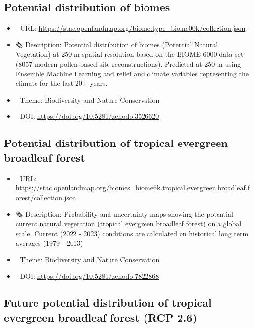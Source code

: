 \documentclass[
  graybox,natbib,nospthms]{svmono}
\providecommand{\tightlist}{%
  \setlength{\itemsep}{0pt}\setlength{\parskip}{0pt}}
\providecommand{\tightlist}{\setlength{\itemsep}{0pt}\setlength{\parskip}{0pt}}
\begin{document}
\hypertarget{potential-distribution-of-biomes}{%
\subsection{Potential distribution of biomes}\label{potential-distribution-of-biomes}}

\begin{itemize}
\tightlist
\item
  🔗 URL: \url{https://stac.openlandmap.org/biome.type_biome00k/collection.json}
\item
  🗞 Description: Potential distribution of biomes (Potential Natural Vegetation) at 250 m spatial resolution based on the BIOME 6000 data set (8057 modern pollen-based site reconstructions). Predicted at 250 m using Ensemble Machine Learning and relief and climate variables representing the climate for the last 20+ years.
\item
  📝 Theme: Biodiversity and Nature Conservation
\item
  📂 DOI: \url{https://doi.org/10.5281/zenodo.3526620}
\end{itemize}

\hypertarget{potential-distribution-of-tropical-evergreen-broadleaf-forest}{%
\subsection{Potential distribution of tropical evergreen broadleaf forest}\label{potential-distribution-of-tropical-evergreen-broadleaf-forest}}

\begin{itemize}
\tightlist
\item
  🔗 URL: \url{https://stac.openlandmap.org/biomes_biome6k.tropical.evergreen.broadleaf.forest/collection.json}
\item
  🗞 Description: Probability and uncertainty maps showing the potential current natural vegetation (tropical evergreen broadleaf forest) on a global scale. Current (2022 - 2023) conditions are calculated on historical long term averages (1979 - 2013)
\item
  📝 Theme: Biodiversity and Nature Conservation
\item
  📂 DOI: \url{https://doi.org/10.5281/zenodo.7822868}
\end{itemize}

\hypertarget{future-potential-distribution-of-tropical-evergreen-broadleaf-forest-rcp-2.6}{%
\subsection{Future potential distribution of tropical evergreen broadleaf forest (RCP 2.6)}\label{future-potential-distribution-of-tropical-evergreen-broadleaf-forest-rcp-2.6}}
\end{document}
